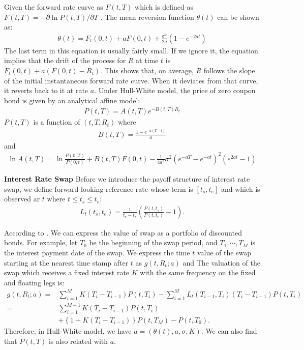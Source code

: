 \documentclass[11pt,a4paper]{article}
\theoremstyle{remark}
\begin{document}
	\noindent Given the forward rate curve as $F(t, T)$ which is defined as $F(t, T) = -\partial \ln P(t, T)/\partial T$ . The mean reversion function $\theta(t)$ can be shown as:
	\begin{align} 
		\theta(t)=F_t(0, t)+a F(0, t)+\frac{\sigma^2}{2 a}\left(1-e^{-2 a t}\right)
	\end{align}
	The last term in this equation is usually fairly small. If we ignore it, the equation implies that the drift of the process for $R$ at time $t$ is $F_t(0, t)+a (F(0, t) - R_t)$. This shows that, on average, $R$  follows the slope of the initial instantaneous forward rate curve. When it deviates from that curve, it reverts back to it at rate $a$.  Under Hull-White model, the price of zero coupon bond is given by an analytical affine model:
	\begin{align} \label{zcb}
	   P(t, T)=A(t, T) e^{-B(t, T) R_t}
	\end{align}
	$P(t, T)$ is a function of $(t, T, R_t)$ where
	\begin{align*}
		B(t, T)=\frac{1-e^{-a(T-t)}}{a}
	\end{align*}
	and
	\begin{align*}
		\ln A(t, T)=\ln \frac{P(0, T)}{P(0, t)}+B(t, T) F(0, t)-\frac{1}{4 a^3} \sigma^2\left(e^{-a T}-e^{-a t}\right)^2\left(e^{2 a t}-1\right)
	\end{align*}
	
	
	\noindent \textbf{Interest Rate Swap}
	Before we introduce the payoff structure of interest rate swap, we define forward-looking reference rate whose term is $[t_s, t_e]$ and which is observed ar $t$ where $t \leq t_s \leq t_e$:
	\begin{align}
		L_t(t_s,t_e) = \frac{1}{t_e - t_s}\left( \frac{P(t, t_s)}{P(t, t_e)} - 1\right).
	\end{align}

	According to \cite{yamakami2022pricing}. We can express the value of swap as a portfolio of discounted bonds. For example, let $T_0$ be the beginning of the swap period, and $T_1, \cdots, T_M$ is the interest payment date of the swap. We express the time $t$ value of the swap starting at the nearest time stamp after $t$  as $g(t, R_t; a)$ and The valuation of the swap which receives a fixed interest rate $K$ with the same frequency on the fixed and floating legs is:
	\begin{align}
		g(t, R_t; a)= & \sum_{i=1}^{M} K\left(T_{i}-T_{i-1}\right) P\left(t, T_i\right)-\sum_{i=1}^{M} L_t\left(T_{i-1}, T_{i}\right)\left(T_i-T_{i-1}\right) P\left(t, T_{i}\right) \\
		= & \sum_{i=1}^{M-1}K\left(T_i-T_{i-1}\right) P\left(t, T_{i}\right) \\
		& +\left\{1+K\left(T_i-T_{i-1}\right)\right\} P\left(t, T_M\right)-P\left(t, T_0\right) .
	\end{align}
	Therefore, in Hull-White model,  we have $a = (\theta(t), a, \sigma, K)$. We can also find that $P(t, T)$ is also related with $a$.
	
\end{document}

